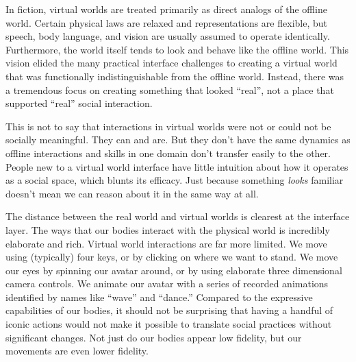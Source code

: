 In fiction, virtual worlds are treated primarily as direct analogs of the offline world. Certain physical laws are relaxed and representations are flexible, but speech, body language, and vision are usually assumed to operate identically. Furthermore, the world itself tends to look and behave like the offline world.  This vision elided the many practical interface challenges to creating a virtual world that was functionally indistinguishable from the offline world. Instead, there was a tremendous focus on creating something that looked ``real'', not a place that supported ``real'' social interaction. 

This is not to say that interactions in virtual worlds were not or could not be socially meaningful. They can and are. But they don't have the same dynamics as offline interactions and skills in one domain don't transfer easily to the other. People new to a virtual world interface have little intuition about how it operates as a social space, which blunts its efficacy. Just because something \emph{looks} familiar doesn't mean we can reason about it in the same way at all.

The distance between the real world and virtual worlds is clearest at the interface layer. The ways that our bodies interact with the physical world is incredibly elaborate and rich. Virtual world interactions are far more limited. We move using (typically) four keys, or by clicking on where we want to stand. We move our eyes by spinning our avatar around, or by using elaborate three dimensional camera controls. We animate our avatar with a series of recorded animations identified by names like ``wave'' and ``dance.'' Compared to the expressive capabilities of our bodies, it should not be surprising that having a handful of iconic actions would not make it possible to translate social practices without significant changes. Not just do our bodies appear low fidelity, but our movements are even lower fidelity. 


